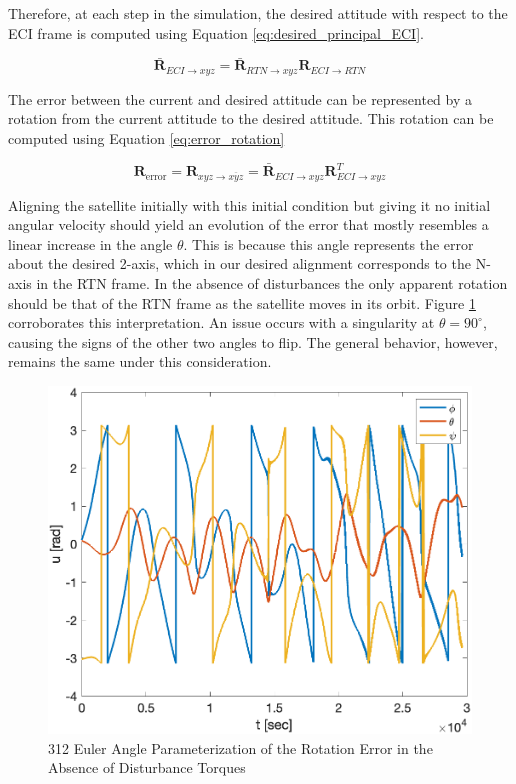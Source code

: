 Therefore, at each step in the simulation, the desired attitude with respect to the ECI frame is computed using Equation \ref{eq:desired_principal_ECI}.

\begin{equation} \label{eq:desired_principal_ECI}
    \boldsymbol{\bar{R}}_{ECI \rightarrow xyz} = \boldsymbol{\bar{R}}_{RTN \rightarrow xyz} \boldsymbol{R}_{ECI \rightarrow RTN}
\end{equation}

The error between the current and desired attitude can be represented by a rotation from the current attitude to the desired attitude. This rotation can be computed using Equation \ref{eq:error_rotation}

\begin{equation} \label{eq:error_rotation}
    \boldsymbol{R}_{\text{error}} = \boldsymbol{R}_{xyz \rightarrow \overline{xyz}} = \boldsymbol{\bar{R}}_{ECI \rightarrow xyz} \boldsymbol{R}_{ECI \rightarrow xyz}^T
\end{equation}

Aligning the satellite initially with this initial condition but giving it no initial angular velocity should yield an evolution of the error that mostly resembles a linear increase in the angle $\theta$. This is because this angle represents the error about the desired 2-axis, which in our desired alignment corresponds to the N-axis in the RTN frame. In the absence of disturbances the only apparent rotation should be that of the RTN frame as the satellite moves in its orbit. Figure \ref{fig:attitude_error_no_dist} corroborates this interpretation. An issue occurs with a singularity at $\theta = 90^\circ$, causing the signs of the other two angles to flip. The general behavior, however, remains the same under this consideration.

\begin{figure}[H]
    \centering
    \captionsetup{ justification = centering }
    \includegraphics[width = 12cm]{Images/PS6/attitude_error_no_dist.png}
    \caption{312 Euler Angle Parameterization of the Rotation Error in the Absence of Disturbance Torques}
    \label{fig:attitude_error_no_dist}
\end{figure}

